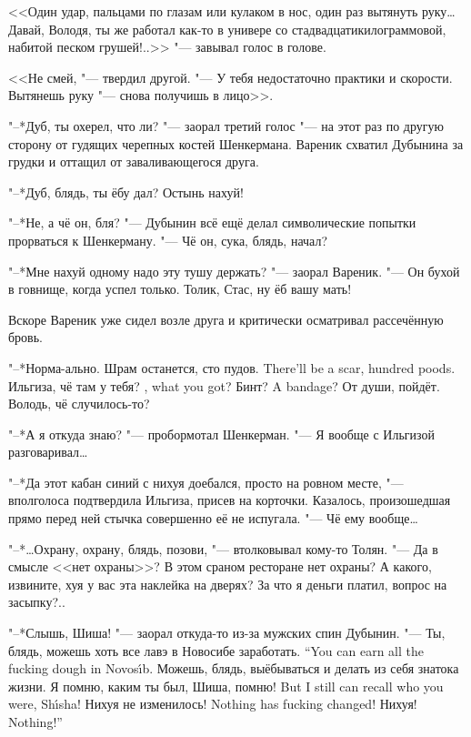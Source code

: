 <<Один удар, пальцами по глазам или кулаком в нос, один раз вытянуть руку\dots{}
Давай, Володя, ты же работал как-то в универе со стадвадцатикилограммовой, набитой песком грушей!..>> "--- завывал голос в голове.

<<Не смей, "--- твердил другой.
"--- У тебя недостаточно практики и скорости.
Вытянешь руку "--- снова получишь в лицо>>.

"--*Дуб, ты охерел, что ли? "--- заорал третий голос "--- на этот раз по другую сторону от гудящих черепных костей Шенкермана.
Вареник схватил Дубынина за грудки и оттащил от заваливающегося друга.

"--*Дуб, блядь, ты ёбу дал?
Остынь нахуй!

"--*Не, а чё он, бля? "--- Дубынин всё ещё делал символические попытки прорваться к Шенкерману.
"--- Чё он, сука, блядь, начал?

"--*Мне нахуй одному надо эту тушу держать? "--- заорал Вареник.
"--- Он бухой в говнище, когда успел только.
Толик, Стас, ну ёб вашу мать!

Вскоре Вареник уже сидел возле друга и критически осматривал рассечённую бровь.

"--*Норма-ально.
{Шрам останется, сто пудов.}
{There'll be a scar, hundred poods.}
{Ильгиза, чё там у тебя?}
{\Ilgiza, what you got?}
{Бинт?}
{A bandage?}
От души, пойдёт.
Володь, чё случилось-то?

"--*А я откуда знаю? "--- пробормотал Шенкерман.
"--- Я вообще с Ильгизой разговаривал\dots{}

"--*Да этот кабан синий с нихуя доебался, просто на ровном месте, "--- вполголоса подтвердила Ильгиза, присев на корточки.
Казалось, произошедшая прямо перед ней стычка совершенно её не испугала.
"--- Чё ему вообще\dots{}

"--*\dots{}Охрану, охрану, блядь, позови, "--- втолковывал кому-то Толян.
"--- Да в смысле <<нет охраны>>?
В этом сраном ресторане нет охраны?
А какого, извините, хуя у вас эта наклейка на дверях?
За что я деньги платил, вопрос на засыпку?..

"--*Слышь, Шиша! "--- заорал откуда-то из-за мужских спин Дубынин.
{"--- Ты, блядь, можешь хоть все лавэ в Новосибе заработать.}
{``You can earn all the fucking dough in Novos\'{\i}b.}
Можешь, блядь, выёбываться и делать из себя знатока жизни.
{Я помню, каким ты был, Шиша, помню!}
{But I still can recall who you were, Sh\'{\i}sha!}
{Нихуя не изменилось!}
{Nothing has fucking changed!}
{Нихуя!}
{Nothing!''}

